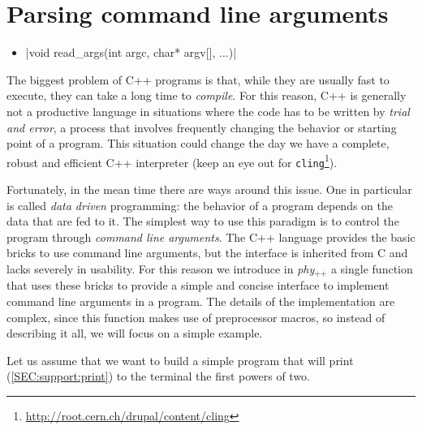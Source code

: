 \documentclass[12pt]{report}
\newcommand{\phypp}{\textit{phy}$_{\text{++}}$\xspace}
\begin{document}
\section{Parsing command line arguments \label{SEC:support:cmd}}

\begin{itemize}
\item \cppinline|void read_args(int argc, char* argv[], ...)| 
\end{itemize}

The biggest problem of C++ programs is that, while they are usually fast to execute, they can take a long time to \emph{compile}. For this reason, C++ is generally not a productive language in situations where the code has to be written by \emph{trial and error}, a process that involves frequently changing the behavior or starting point of a program. This situation could change the day we have a complete, robust and efficient C++ interpreter (keep an eye out for \texttt{cling}\footnote{\url{http://root.cern.ch/drupal/content/cling}}).

Fortunately, in the mean time there are ways around this issue. One in particular is called \emph{data driven} programming: the behavior of a program depends on the data that are fed to it. The simplest way to use this paradigm is to control the program through \emph{command line arguments}. The C++ language provides the basic bricks to use command line arguments, but the interface is inherited from C and lacks severely in usability. For this reason we introduce in \phypp a single function  that uses these bricks to provide a simple and concise interface to implement command line arguments in a program. The details of the implementation are complex, since this function makes use of preprocessor macros, so instead of describing it all, we will focus on a simple example.

Let us assume that we want to build a simple program that will print (\ref{SEC:support:print}) to the terminal the first  powers of two.
\end{document}
